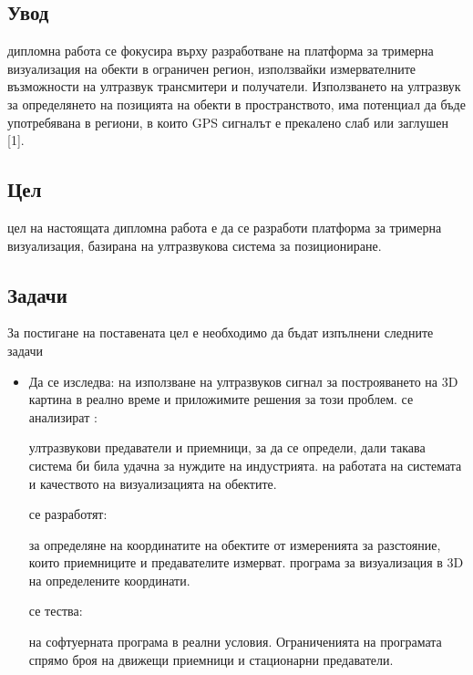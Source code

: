\subsection{Увод}
 дипломна работа се фокусира върху разработване на платформа за тримерна визуализация на обекти в ограничен регион, използвайки измервателните възможности на ултразвук трансмитери и получатели. Използването на ултразвук за определянето на позицията на обекти в пространството, има потенциал да бъде употребявана в региони, в които GPS сигналът е прекалено слаб или заглушен [1].

\subsection{Цел}
 цел на настоящата дипломна работа е да се разработи платформа за тримерна визуализация, базирана на ултразвукова система за позициониране.

\subsection{Задачи}
За постигане на поставената цел е необходимо да бъдат изпълнени следните задачи
\begin{itemize}
    \item Да се изследва:
     на използване на ултразвуков сигнал за построяването на 3D картина в реално време и приложимите решения за този проблем.
     се анализират :
    \begin{enumerate}
      ултразвукови предаватели и приемници, за да се определи, дали такава система би била удачна за нуждите на индустрията.
      на работата на системата и качеството на визуализацията на обектите.
    \end{enumerate}
     се разработят:
    \begin{enumerate}
     за определяне на координатите на обектите от измеренията за разстояние, които приемниците и предавателите измерват.
     програма за визуализация в 3D на определените координати.
    \end{enumerate}
     се тества:
    \begin{enumerate}
     на софтуерната програма в реални условия.
    Ограниченията на програмата спрямо броя на движещи приемници и стационарни предаватели.
    \end{enumerate}
\end{itemize}